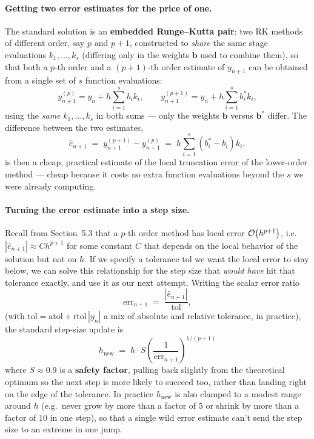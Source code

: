 \paragraph{Getting two error estimates for the price of one.} The standard solution is an \textbf{embedded Runge--Kutta pair}: two RK methods of different order, say $p$ and $p+1$, constructed to \emph{share} the same stage evaluations $k_1,\dots,k_s$ (differing only in the weights $\mathbf b$ used to combine them), so that both a $p$-th order and a $(p{+}1)$-th order estimate of $y_{n+1}$ can be obtained from a single set of $s$ function evaluations:
\begin{equation}
y_{n+1}^{(p)} = y_n + h\sum_{i=1}^s b_i k_i, \qquad y_{n+1}^{(p+1)} = y_n + h\sum_{i=1}^s b_i^\ast k_i,
\end{equation}
using the \emph{same} $k_1,\dots,k_s$ in both sums --- only the weights $\mathbf b$ versus $\mathbf b^\ast$ differ. The difference between the two estimates,
\begin{equation}
\widehat{e}_{n+1} \;=\; y_{n+1}^{(p+1)} - y_{n+1}^{(p)} \;=\; h\sum_{i=1}^s \left(b_i^\ast - b_i\right) k_i,
\label{eq:embedded-error}
\end{equation}
is then a cheap, practical estimate of the local truncation error of the lower-order method --- cheap because it costs no extra function evaluations beyond the $s$ we were already computing.

\paragraph{Turning the error estimate into a step size.} Recall from Section~5.3 that a $p$-th order method has local error $\mathcal{O}\!\left(h^{p+1}\right)$, i.e.\ $|\widehat{e}_{n+1}| \approx C h^{p+1}$ for some constant $C$ that depends on the local behavior of the solution but not on $h$. If we specify a tolerance $\mathrm{tol}$ we want the local error to stay below, we can solve this relationship for the step size that \emph{would have} hit that tolerance exactly, and use it as our next attempt. Writing the scalar error ratio
\begin{equation}
\mathrm{err}_{n+1} \;=\; \frac{|\widehat{e}_{n+1}|}{\mathrm{tol}},
\end{equation}
(with $\mathrm{tol} = \mathrm{atol} + \mathrm{rtol}\,|y_n|$ a mix of absolute and relative tolerance, in practice), the standard step-size update is
\begin{equation}
\boxed{\, h_{\mathrm{new}} \;=\; h \cdot S \left(\frac{1}{\mathrm{err}_{n+1}}\right)^{1/(p+1)} \,}
\label{eq:step-control}
\end{equation}
where $S \approx 0.9$ is a \textbf{safety factor}, pulling back slightly from the theoretical optimum so the next step is more likely to succeed too, rather than landing right on the edge of the tolerance. In practice $h_{\mathrm{new}}$ is also clamped to a modest range around $h$ (e.g.\ never grow by more than a factor of $5$ or shrink by more than a factor of $10$ in one step), so that a single wild error estimate can't send the step size to an extreme in one jump.

